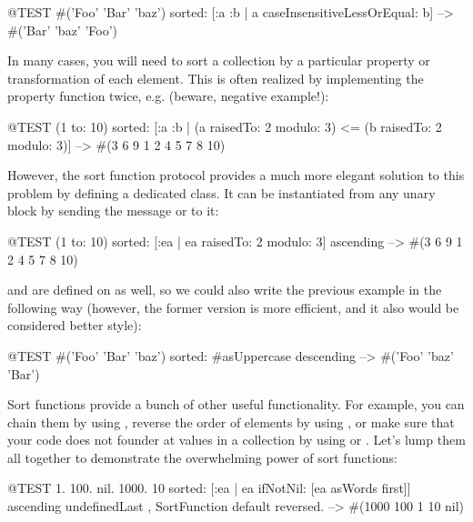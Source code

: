 \documentclass[a4paper,10pt,twoside]{book}
\begin{document}
\begin{code}{@TEST}
#('Foo' 'Bar' 'baz') sorted: [:a :b | a caseInsensitiveLessOrEqual: b] --> #('Bar' 'baz' 'Foo')
\end{code}

In many cases, you will need to sort a collection by a particular property or transformation of each element.
This is often realized by implementing the property function twice, e.g. (beware, negative example!):
\begin{code}{@TEST}
(1 to: 10) sorted: [:a :b | (a raisedTo: 2 modulo: 3) <= (b raisedTo: 2 modulo: 3)] --> #(3 6 9 1 2 4 5 7 8 10)
\end{code}

However, the sort function protocol provides a much more elegant solution to this problem by defining a dedicated  class.
It can be instantiated from any unary block by sending the message  or  to it:

\begin{code}{@TEST}
(1 to: 10) sorted: [:ea | ea raisedTo: 2 modulo: 3] ascending --> #(3 6 9 1 2 4 5 7 8 10)
\end{code}

 and  are defined on  as well, so we could also write the previous example in the following way (however, the former version is more efficient, and it also would be considered better style):

\begin{code}{@TEST}
#('Foo' 'Bar' 'baz') sorted: #asUppercase descending --> #('Foo' 'baz' 'Bar')
\end{code}

Sort functions provide a bunch of other useful functionality.
For example, you can chain them by using , reverse the order of elements by using , or make sure that your code does not founder at  values in a collection by using  or .
Let's lump them all together to demonstrate the overwhelming power of sort functions:

\begin{code}{@TEST}
{1. 100. nil. 1000. 10} sorted: [:ea | ea ifNotNil: [ea asWords first]] ascending undefinedLast , SortFunction default reversed. --> #(1000 100 1 10 nil)
\end{code}
\end{document}
